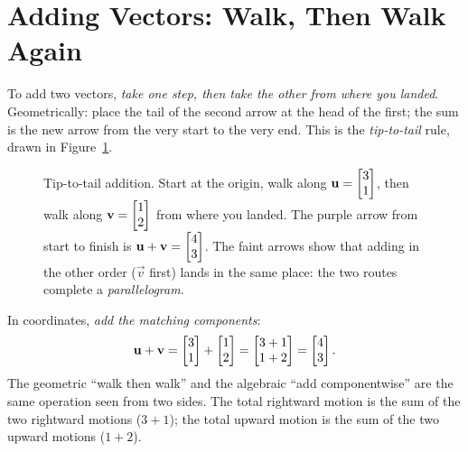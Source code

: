 \section{Adding Vectors: Walk, Then Walk Again}
\label{ch02:add}

To add two vectors, \emph{take one step, then take the other from where you landed}.
Geometrically: place the tail of the second arrow at the head of the first; the sum is
the new arrow from the very start to the very end. This is the \emph{tip-to-tail} rule,
drawn in Figure~\ref{ch02:fig-add}.

\begin{figure}[H]
\centering
{}
\caption{Tip-to-tail addition. Start at the origin, walk along $\mathbf{u}=\begin{bmatrix}3\\1\end{bmatrix}$,
then walk along $\mathbf{v}=\begin{bmatrix}1\\2\end{bmatrix}$ from where you landed. The purple arrow from
start to finish is $\mathbf{u}+\mathbf{v}=\begin{bmatrix}4\\3\end{bmatrix}$. The faint arrows show that adding in
the other order ($\vec{v}$ first) lands in the same place: the two routes complete a
\emph{parallelogram}.}
\label{ch02:fig-add}
\end{figure}

In coordinates, \emph{add the matching components}:
\[
  \mathbf{u}+\mathbf{v}
  = \begin{bmatrix}3 \\ 1\end{bmatrix} + \begin{bmatrix}1 \\ 2\end{bmatrix}
  = \begin{bmatrix}3+1 \\ 1+2\end{bmatrix}
  = \begin{bmatrix}4 \\ 3\end{bmatrix}.
\]
The geometric ``walk then walk'' and the algebraic ``add componentwise'' are the same
operation seen from two sides. The total rightward motion is the sum of the two rightward
motions ($3+1$); the total upward motion is the sum of the two upward motions ($1+2$).

